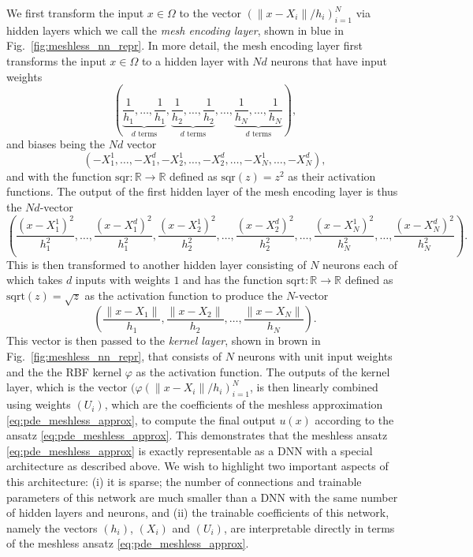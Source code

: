 \documentclass[12pt]{article}
\begin{document}
We first transform the input  $x \in \Omega$ to the vector $(\lVert x - X_i\rVert/h_i)_{i=1}^N$ via hidden layers which we call the \emph{mesh encoding layer}, shown in blue in Fig.~\ref{fig:meshless_nn_repr}. In more detail, the mesh encoding layer first transforms the input $x \in \Omega$ to a hidden layer with $Nd$ neurons that have input weights
\begin{displaymath}
\left(\underbrace{\frac{1}{h_1}, \ldots, \frac{1}{h_1}}_{\text{$d$ terms}}, \underbrace{\frac{1}{h_2}, \ldots, \frac{1}{h_2}}_{\text{$d$ terms}}, \ldots, \underbrace{\frac{1}{h_N}, \ldots, \frac{1}{h_N}}_{\text{$d$ terms}} \right),
\end{displaymath}
and biases being the $Nd$ vector
\begin{displaymath}
(-X_1^1, \ldots, -X_1^d, -X_2^1, \ldots, -X_2^d, \ldots, -X_N^1, \ldots, -X_N^d),
\end{displaymath}
and with the function $\text{sqr}:\mathbb{R} \to \mathbb{R}$ defined as $\text{sqr}(z) = z^2$ as their activation functions. The output of the first hidden layer of the mesh encoding layer is thus the $Nd$-vector
\begin{displaymath}
\left(\frac{(x - X_1^1)^2}{h_1^2}, \ldots, \frac{(x - X_1^d)^2}{h_1^2}, \frac{(x - X_2^1)^2}{h_2^2}, \ldots, \frac{(x - X_2^d)^2}{h_2^2}, \ldots, \frac{(x - X_N^1)^2}{h_N^2}, \ldots, \frac{(x - X_N^d)^2}{h_N^2}\right).
\end{displaymath}
This is then transformed to another hidden layer consisting of $N$ neurons each of which takes $d$ inputs with weights $1$ and has the function $\text{sqrt}:\mathbb{R} \to \mathbb{R}$ defined as $\text{sqrt}(z) = \sqrt{z}$ as the activation function to produce the $N$-vector
\begin{displaymath}
\left(\frac{\lVert x - X_1\rVert}{h_1}, \frac{\lVert x - X_2\rVert}{h_2}, \ldots, \frac{\lVert x - X_N\rVert}{h_N}\right).
\end{displaymath}
This vector is then passed to the \emph{kernel layer}, shown in brown in Fig.~\ref{fig:meshless_nn_repr}, that consists of $N$ neurons with unit input weights and the the RBF kernel $\varphi$ as the activation function. The outputs of the kernel layer, which is the vector $(\varphi(\lVert x - X_i\rVert/h_i)_{i=1}^N$, is then linearly combined using weights $(U_i)$, which are the coefficients of the meshless approximation \eqref{eq:pde_meshless_approx}, to compute the final output $u(x)$ according to the ansatz \eqref{eq:pde_meshless_approx}. This demonstrates that the meshless ansatz \eqref{eq:pde_meshless_approx} is exactly representable as a DNN with a special architecture as described above. We wish to highlight two important aspects of this architecture: (i) it is sparse; the number of connections and trainable parameters of this network are much smaller than a DNN with the same number of hidden layers and neurons, and (ii) the trainable coefficients of this network, namely the vectors $(h_i)$, $(X_i)$ and $(U_i)$, are interpretable directly in terms of the meshless ansatz \eqref{eq:pde_meshless_approx}.
\end{document}
